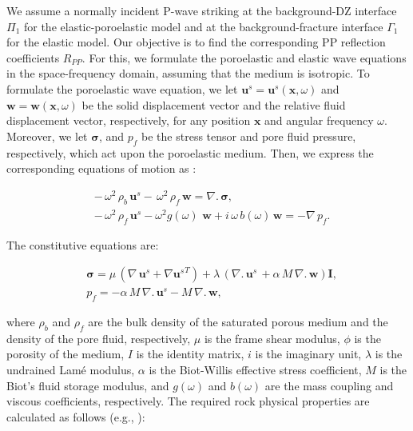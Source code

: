 \documentclass[draft]{agujournal2019}
\begin{document}
We assume a normally incident P-wave striking at the background-DZ interface $\Pi_1$ for the elastic-poro\-elastic model and at the background-fracture interface $\Gamma_1$ for the elastic model. Our objective is to find the corresponding PP reflection coefficients $R_{PP}$. For this, we formulate the poroelastic and elastic wave equations in the space-frequency domain, assuming that the  medium is isotropic. To formulate the poroelastic wave equation,  we let $\mathbf{u}^s =\mathbf{u}^s( \mathbf{x}, \omega)$ and $\mathbf{w} =\mathbf{w}( \mathbf{x}, \omega)$  be the solid displacement vector and the relative fluid displacement vector, respectively, for any position $\bm{x}$ and angular frequency $\omega$. Moreover, we let $\bm{\sigma}$, and $p_f$ be the stress tensor and pore fluid pressure, respectively, which act upon the poroelastic medium. Then, we  express the corresponding equations of motion as \cite{Biot1962}:
\begin{linenomath*}
\begin{equation}\label{Eq.1}
\begin{split}
& -\,\omega^2  \, \rho_b  \, \mathbf{u}^s -  \,\omega^2 \, \rho_f \, \mathbf{w}= \nabla . \, \bm{\sigma}, \\
& -\,\omega^2  \, \rho_f \, \mathbf{u}^s - \omega^2 g(\omega) \, \, \mathbf{w} + i \, \omega \, b(\omega) \, \mathbf{w} = - \nabla \, p_f.
\end{split}
\end{equation}
\end{linenomath*}
The constitutive equations are:
\begin{linenomath*}
\begin{equation}\label{Eq.2}
\begin{split}
& \bm{\sigma} = \mu \,  \left( \nabla \,\mathbf{u}^s + {\nabla  \mathbf{u}^s}^T  \right) + \lambda \, \left( \nabla . \, \mathbf{u}^s\, + \alpha \,M \, \nabla . \, \mathbf{w} \right) \mathbf{I}, \\
&p_f=- \alpha \, M \, \nabla . \, \mathbf{u}^s - M \, \nabla . \, \mathbf{w}, 
 \end{split}
\end{equation}
\end{linenomath*}
where $\rho_b$ and $\rho_f$ are the bulk density of the saturated porous medium and the density of the pore fluid, respectively, $\mu$ is the frame shear modulus, $\phi$ is the porosity of the medium, $I$ is the identity matrix, $i$ is the imaginary unit, $\lambda$ is the undrained Lamé modulus, $\alpha$ is the Biot-Willis effective stress coefficient, $M$ is the Biot's fluid storage modulus, and $g(\omega)$ and $b(\omega)$ are the mass coupling and viscous coefficients, respectively. The required rock physical properties are calculated as follows (e.g., ):
\end{document}
